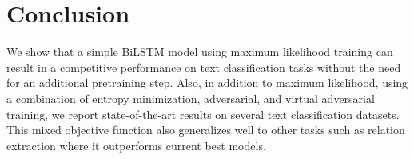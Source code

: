 \documentclass[letterpaper]{article}
\begin{document}
\section{Conclusion}   \label{sec:conclusion}
We show that a simple BiLSTM model using maximum likelihood training can result in a competitive performance on text classification tasks without the need for an additional pretraining step. Also, in addition to maximum likelihood, using a combination of entropy minimization, adversarial, and virtual adversarial training, we report state-of-the-art results on several text classification datasets. This mixed objective function also generalizes well to other tasks such as relation extraction where it outperforms current best models.

\small


\end{document}
